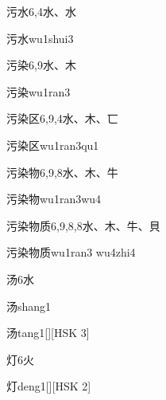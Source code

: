 \begin{entry}{污水}{6,4}{⽔、⽔}
  \begin{phonetics}{污水}{wu1shui3}
  \end{phonetics}
\end{entry}

\begin{entry}{污染}{6,9}{⽔、⽊}
  \begin{phonetics}{污染}{wu1ran3}
  \end{phonetics}
\end{entry}

\begin{entry}{污染区}{6,9,4}{⽔、⽊、⼖}
  \begin{phonetics}{污染区}{wu1ran3qu1}
  \end{phonetics}
\end{entry}

\begin{entry}{污染物}{6,9,8}{⽔、⽊、⽜}
  \begin{phonetics}{污染物}{wu1ran3wu4}
  \end{phonetics}
\end{entry}

\begin{entry}{污染物质}{6,9,8,8}{⽔、⽊、⽜、⾙}
  \begin{phonetics}{污染物质}{wu1ran3 wu4zhi4}
  \end{phonetics}
\end{entry}

\begin{entry}{汤}{6}{⽔}
  \begin{phonetics}{汤}{shang1}
  \end{phonetics}
  \begin{phonetics}{汤}{tang1}[][HSK 3]
  \end{phonetics}
\end{entry}

\begin{entry}{灯}{6}{⽕}
  \begin{phonetics}{灯}{deng1}[][HSK 2]
  \end{phonetics}
\end{entry}

